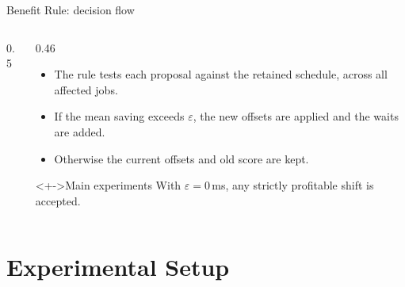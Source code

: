 \documentclass[aspectratio=169,11pt,c]{beamer}
\newcommand{\iconbase}[3]{%
 \begin{scope}[shift={#1}]
  \fill[#2] (0,0) circle (0.36cm);
  \begin{scope}[ico,scale=0.9]#3\end{scope}
 \end{scope}}
\newcommand{\iconLock}[2]{\iconbase{#1}{#2}{%
 \fill[white] (-0.16,-0.18) rectangle (0.16,0.0);
 \draw (-0.09,0.0)--(-0.09,0.07) .. controls (-0.09,0.22) and (0.09,0.22) .. (0.09,0.07)--(0.09,0.0);}}
\begin{document}
\begin{frame}{Benefit Rule: decision flow}
\begin{columns}[c]
\begin{column}{0.5\textwidth}
    \end{column}
    \begin{column}{0.46\textwidth}
      \small
      \begin{itemize}[<+->]
        \item The rule tests each proposal against the retained schedule, across all affected jobs.
        \item If the mean saving exceeds $\varepsilon$, the new offsets are applied and the waits are added.
        \item Otherwise the current offsets and old score are kept.
      \end{itemize}
      \begin{alertblock}<+->{Main experiments}
        With $\varepsilon=0$\,ms, any strictly profitable shift is accepted.
      \end{alertblock}
    \end{column}
  \end{columns}
\end{frame}

\section{Experimental Setup}
\end{document}
